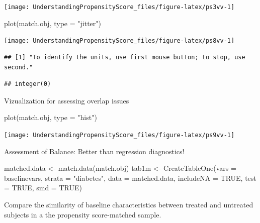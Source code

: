 \documentclass[
]{book}
\newenvironment{Shaded}{\begin{snugshade}}{\end{snugshade}}
\newcommand{\AttributeTok}[1]{\textcolor[rgb]{0.77,0.63,0.00}{#1}}
\newcommand{\ConstantTok}[1]{\textcolor[rgb]{0.00,0.00,0.00}{#1}}
\newcommand{\FunctionTok}[1]{\textcolor[rgb]{0.00,0.00,0.00}{#1}}
\newcommand{\NormalTok}[1]{#1}
\newcommand{\OtherTok}[1]{\textcolor[rgb]{0.56,0.35,0.01}{#1}}
\newcommand{\StringTok}[1]{\textcolor[rgb]{0.31,0.60,0.02}{#1}}
\begin{document}
\texttt{[image: UnderstandingPropensityScore\_files/figure-latex/ps3vv-1]}

\begin{Shaded}
\begin{Highlighting}[]
\FunctionTok{plot}\NormalTok{(match.obj, }\AttributeTok{type =} \StringTok{"jitter"}\NormalTok{)}
\end{Highlighting}
\end{Shaded}

\texttt{[image: UnderstandingPropensityScore\_files/figure-latex/ps8vv-1]}

\begin{verbatim}
## [1] "To identify the units, use first mouse button; to stop, use second."
\end{verbatim}

\begin{verbatim}
## integer(0)
\end{verbatim}

Vizualization for assessing overlap issues

\begin{Shaded}
\begin{Highlighting}[]
\FunctionTok{plot}\NormalTok{(match.obj, }\AttributeTok{type =} \StringTok{"hist"}\NormalTok{)}
\end{Highlighting}
\end{Shaded}

\texttt{[image: UnderstandingPropensityScore\_files/figure-latex/ps9vv-1]}

Assessment of Balance: Better than regression diagnostics!

\begin{Shaded}
\begin{Highlighting}[]
\NormalTok{matched.data }\OtherTok{\textless{}{-}} \FunctionTok{match.data}\NormalTok{(match.obj)}
\NormalTok{tab1m }\OtherTok{\textless{}{-}} \FunctionTok{CreateTableOne}\NormalTok{(}\AttributeTok{vars =}\NormalTok{ baselinevars, }
                        \AttributeTok{strata =} \StringTok{"diabetes"}\NormalTok{, }
                        \AttributeTok{data =}\NormalTok{ matched.data, }
                        \AttributeTok{includeNA =} \ConstantTok{TRUE}\NormalTok{, }
                        \AttributeTok{test =} \ConstantTok{TRUE}\NormalTok{, }\AttributeTok{smd =} \ConstantTok{TRUE}\NormalTok{)}
\end{Highlighting}
\end{Shaded}

Compare the similarity of baseline characteristics between treated and untreated subjects in a the propensity score-matched sample.
\end{document}
